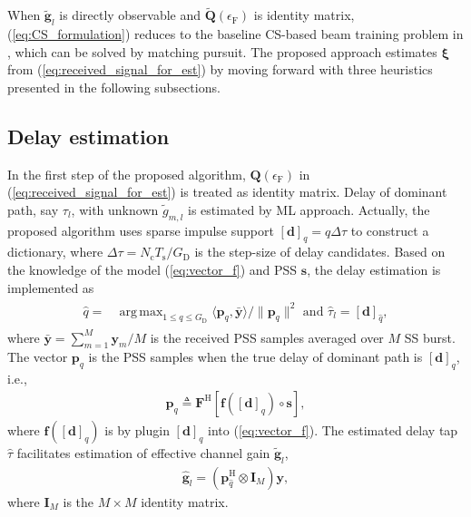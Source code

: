 \documentclass[journal]{IEEEtran}
\DeclareMathOperator*{\argmax}{arg\,max} %
\newcommand{\hermitian}[0]{\text{H}}
\newcommand{\CFO}[0]{\epsilon_{\text{F}}}
\newcommand{\Ts}[0]{T_{\text{s}}}
\newcommand{\Nc}[0]{N_{\text{c}}}
\newcommand{\Gd}[0]{G_{\text{D}}}
\begin{document}
When $\tilde{\mathbf{g}}_l$ is directly observable and $\tilde{\mathbf{Q}}(\CFO)$ is identity matrix, (\ref{eq:CS_formulation}) reduces to the baseline CS-based beam training problem in \cite[Sec. V]{7400949}, which can be solved by matching pursuit. The proposed approach estimates $\boldsymbol{\xi}$ from (\ref{eq:received_signal_for_est}) by moving forward with three heuristics presented in the following subsections.


\subsection{Delay estimation}

In the first step of the proposed algorithm, $\mathbf{Q}(\CFO)$ in (\ref{eq:received_signal_for_est}) is treated as identity matrix. Delay of dominant path, say $\tau_l$, with unknown $\tilde{g}_{m,l}$ is estimated by ML approach.
Actually, the proposed algorithm uses sparse impulse support $[\mathbf{d}
]_q = q\Delta\tau$ to construct a dictionary, where $\Delta \tau = \Nc\Ts/\Gd$ is the step-size of delay candidates. Based on the knowledge of the model (\ref{eq:vector_f}) and PSS $\mathbf{s}$, the delay estimation is implemented as 
\begin{align}
\begin{split}
\hat{q} = & \argmax_{1\leq q \leq G_{\text{D}}}\langle \mathbf{p}_q,\bar{\mathbf{y}}\rangle /\|\mathbf{p}_q\|^2\text{ and }\hat{\tau}_l = [\mathbf{d}]_{\hat{q}},
\end{split}
\label{eq:delay_est_start}
\end{align}
where $\bar{\mathbf{y}} = \sum_{m=1}^{M}\mathbf{y}_m/M$ is the received PSS samples averaged over $M$ SS burst. The vector $\mathbf{p}_q$ is the PSS samples when the true delay of dominant path is $[\mathbf{d}]_q$, i.e.,
\begin{align}
\mathbf{p}_q \triangleq  \mathbf{F}^{\hermitian}\left[\mathbf{f}\left([\mathbf{d}]_q\right)\circ \mathbf{s}\right],
\label{eq:delay_vec_dictionary}
\end{align}
where $\mathbf{f}([\mathbf{d}]_q)$ is by plugin $[\mathbf{d}]_q$ into (\ref{eq:vector_f}). The estimated delay tap $\hat{\tau}$ facilitates estimation of effective channel gain $\tilde{\mathbf{g}}_l$, 
\begin{align}
\hat{\mathbf{g}}_l = \left(\mathbf{p}_{\hat{q}}^{\hermitian} \otimes \mathbf{I}_M \right)\mathbf{y},
\label{eq:adjust_from_delay_est}
\end{align}
where $\mathbf{I}_M$ is the $M\times M$ identity matrix.
\end{document}
